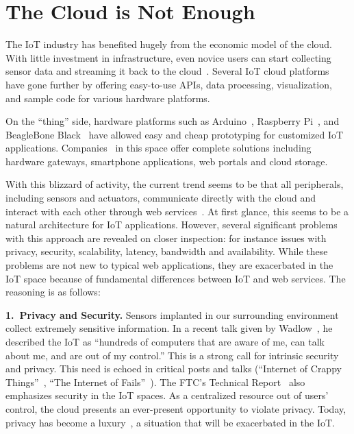 \section{The Cloud is Not Enough}
\label{sec:cloud-not-enough}

The IoT industry has benefited hugely from the economic model of the cloud.
With little investment in infrastructure, even novice users can start collecting
sensor data and streaming it back to the cloud~\cite{armbrust2010view}.  Several
IoT cloud platforms~\cite{carriots, grovestreams, xively, sami} have gone
further by offering easy-to-use APIs, data processing, visualization, and sample
code for various hardware platforms.

On the ``thing'' side, hardware platforms such as Arduino~\cite{arduino},
Raspberry Pi~\cite{rpi}, and BeagleBone Black~\cite{bbb} have allowed easy and
cheap prototyping for customized IoT applications.  Companies~\cite{ninja,
  smartthings, wink} in this space offer complete solutions including hardware
gateways, smartphone applications, web portals and cloud storage.

With this blizzard of activity, the current trend seems to be that all
peripherals, including sensors and actuators, communicate directly with the
cloud and interact with each other through web services~\cite{lee2014swarm}.  At
first glance, this seems to be a natural architecture for IoT applications.
However, several significant problems with this approach are revealed on closer
inspection: for instance issues with privacy, security, scalability, latency,
bandwidth and availability.  While these problems are not new to typical web
applications, they are exacerbated in the IoT space because of fundamental
differences between IoT and web services. The reasoning is as follows:

\noindent\textbf{1.~Privacy and Security.} Sensors
implanted in our surrounding environment collect extremely sensitive
information.  In a recent talk given by Wadlow~\cite{wadlow}, he described the
IoT as ``hundreds of computers that are aware of me, can talk about me, and are
out of my control.''  This is a strong call for intrinsic security and privacy.
This need is echoed in critical posts and talks (``Internet of Crappy
Things''~\cite{alex2015internet}, ``The Internet of
Fails''~\cite{stanislav2014the}).  The FTC's Technical
Report~\cite{ftc2015internet} also emphasizes security in the IoT spaces.  As a
centralized resource out of users' control, the cloud presents an ever-present
opportunity to violate privacy.  Today, privacy has become a
luxury~\cite{angwin2014has}, a situation that will be exacerbated in the IoT.


